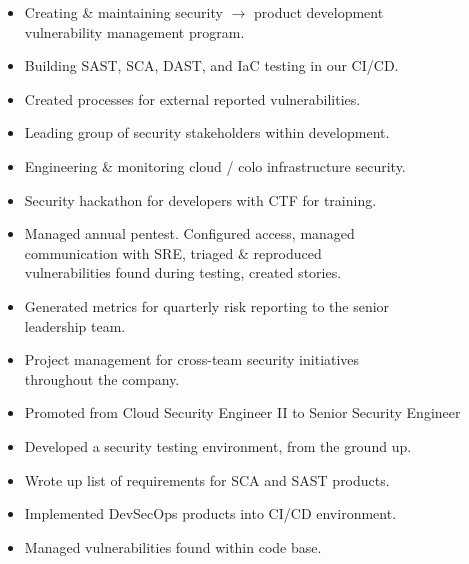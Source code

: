 \documentclass[10pt,a4paper,ragged2e]{rohrbach}
\begin{document}
\begin{paracol}{2}

\begin{itemize}
  \item Creating \& maintaining security $\rightarrow$ product development\\ vulnerability management program.
  \item Building SAST, SCA, DAST, and IaC testing in our CI/CD.
  \item Created processes for external reported vulnerabilities.
  \item Leading group of security stakeholders within development.
  \item Engineering \& monitoring cloud / colo infrastructure security.
  \item Security hackathon for developers with CTF for training.
  \item Managed annual pentest. Configured access, managed \\communication with SRE, triaged \& reproduced \\vulnerabilities found during testing, created stories.
  \item Generated metrics for quarterly risk reporting to the senior \\leadership team.
  \item Project management for cross-team security initiatives\\ throughout the company. 
  \item Promoted from Cloud Security Engineer II to Senior Security Engineer
\end{itemize}

\divider

\begin{itemize}
  \item Developed a security testing environment, from the ground up.
  \item Wrote up list of requirements for SCA and SAST products.
  \item Implemented DevSecOps products into CI/CD environment.
  \item Managed vulnerabilities found within code base.
\end{itemize}


\end{paracol}
\end{document}
